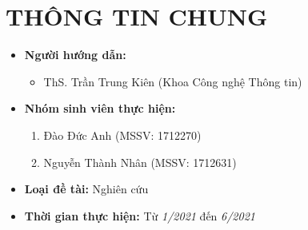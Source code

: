 \documentclass{article}[14pt]
\begin{document}
    \section{THÔNG TIN CHUNG}
    \begin{itemize}[label = {}]
        
        \item \textbf{Người hướng dẫn:} 
        \begin{itemize}
            \item ThS. Trần Trung Kiên (Khoa Công nghệ Thông tin)
        \end{itemize}{}
    
        
        \item \textbf{Nhóm sinh viên thực hiện:}
        
        \begin{enumerate}
        
            \item Đào Đức Anh (MSSV: 1712270)
            \item Nguyễn Thành Nhân (MSSV: 1712631)
            
        \end{enumerate}

        \item \textbf{Loại đề tài:} Nghiên cứu
        
        \item \textbf{Thời gian thực hiện:} Từ \textit{1/2021} đến \textit{6/2021}
        
        
    \end{itemize}
    
\end{document}
